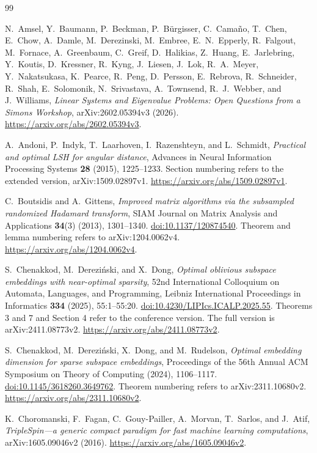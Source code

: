 \documentclass[11pt]{article}
\theoremstyle{definition}
\theoremstyle{remark}
\theoremstyle{plain}
\begin{document}
\begin{thebibliography}{99}

N.~Amsel, Y.~Baumann, P.~Beckman, P.~B\"urgisser, C.~Cama\~no,
T.~Chen, E.~Chow, A.~Damle, M.~Derezinski, M.~Embree,
E.~N.~Epperly, R.~Falgout, M.~Fornace, A.~Greenbaum, C.~Greif,
D.~Halikias, Z.~Huang, E.~Jarlebring, Y.~Koutis, D.~Kressner,
R.~Kyng, J.~Liesen, J.~Lok, R.~A.~Meyer, Y.~Nakatsukasa,
K.~Pearce, R.~Peng, D.~Persson, E.~Rebrova, R.~Schneider,
R.~Shah, E.~Solomonik, N.~Srivastava, A.~Townsend, R.~J.~Webber,
and J.~Williams,
\emph{Linear Systems and Eigenvalue Problems: Open Questions from
a Simons Workshop}, arXiv:2602.05394v3 (2026).
\url{https://arxiv.org/abs/2602.05394v3}.

A.~Andoni, P.~Indyk, T.~Laarhoven, I.~Razenshteyn, and L.~Schmidt,
\emph{Practical and optimal LSH for angular distance},
Advances in Neural Information Processing Systems \textbf{28}
(2015), 1225--1233.
Section numbering refers to the extended version, arXiv:1509.02897v1.
\url{https://arxiv.org/abs/1509.02897v1}.

C.~Boutsidis and A.~Gittens,
\emph{Improved matrix algorithms via the subsampled randomized
Hadamard transform},
SIAM Journal on Matrix Analysis and Applications \textbf{34}(3)
(2013), 1301--1340.
\href{https://doi.org/10.1137/120874540}{doi:10.1137/120874540}.
Theorem and lemma numbering refers to arXiv:1204.0062v4.
\url{https://arxiv.org/abs/1204.0062v4}.

S.~Chenakkod, M.~Derezi\'nski, and X.~Dong,
\emph{Optimal oblivious subspace embeddings with near-optimal sparsity},
52nd International Colloquium on Automata, Languages, and Programming,
Leibniz International Proceedings in Informatics \textbf{334}
(2025), 55:1--55:20.
\href{https://doi.org/10.4230/LIPIcs.ICALP.2025.55}{doi:10.4230/LIPIcs.ICALP.2025.55}.
Theorems 3 and 7 and Section 4 refer to the conference version.
The full version is arXiv:2411.08773v2.
\url{https://arxiv.org/abs/2411.08773v2}.

S.~Chenakkod, M.~Derezi\'nski, X.~Dong, and M.~Rudelson,
\emph{Optimal embedding dimension for sparse subspace embeddings},
Proceedings of the 56th Annual ACM Symposium on Theory of Computing
(2024), 1106--1117.
\href{https://doi.org/10.1145/3618260.3649762}{doi:10.1145/3618260.3649762}.
Theorem numbering refers to arXiv:2311.10680v2.
\url{https://arxiv.org/abs/2311.10680v2}.

K.~Choromanski, F.~Fagan, C.~Gouy-Pailler, A.~Morvan,
T.~Sarlos, and J.~Atif,
\emph{TripleSpin---a generic compact paradigm for fast machine
learning computations}, arXiv:1605.09046v2 (2016).
\url{https://arxiv.org/abs/1605.09046v2}.


\end{thebibliography}
\end{document}
